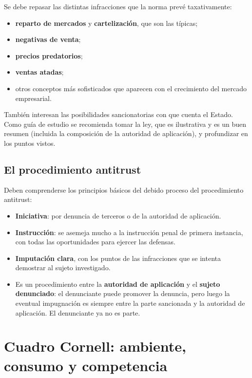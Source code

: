 \documentclass[12pt,oneside]{book}
\begin{document}
Se debe repasar las distintas infracciones que la norma prevé taxativamente:
\begin{itemize}
    \item \textbf{reparto de mercados} y \textbf{cartelización}, que son las típicas;
    \item \textbf{negativas de venta};
    \item \textbf{precios predatorios};
    \item \textbf{ventas atadas};
    \item otros conceptos más sofisticados que aparecen con el crecimiento del mercado empresarial.
\end{itemize}

También interesan las posibilidades sancionatorias con que cuenta el Estado. Como guía de estudio se recomienda tomar la ley, que es ilustrativa y es un buen resumen (incluida la composición de la autoridad de aplicación), y profundizar en los puntos vistos.

\subsection{El procedimiento antitrust}

Deben comprenderse los principios básicos del debido proceso del procedimiento antitrust:
\begin{itemize}
    \item \textbf{Iniciativa}: por denuncia de terceros o de la autoridad de aplicación.
    \item \textbf{Instrucción}: se asemeja mucho a la instrucción penal de primera instancia, con todas las oportunidades para ejercer las defensas.
    \item \textbf{Imputación clara}, con los puntos de las infracciones que se intenta demostrar al sujeto investigado.
    \item Es un procedimiento entre la \textbf{autoridad de aplicación} y el \textbf{sujeto denunciado}: el denunciante puede promover la denuncia, pero luego la eventual impugnación es siempre entre la parte sancionada y la autoridad de aplicación. El denunciante ya no es parte.
\end{itemize}

\section{Cuadro Cornell: ambiente, consumo y competencia}
\end{document}
